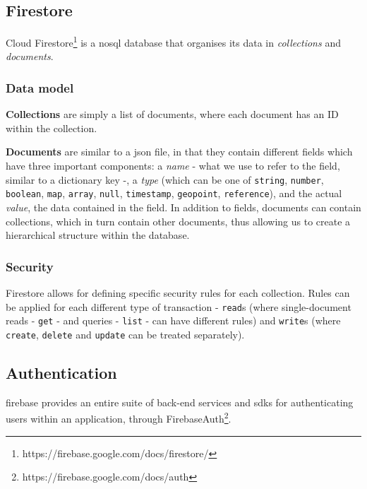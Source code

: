 \subsection{Firestore} \label{5:firestore}
Cloud Firestore\footnote{https://firebase.google.com/docs/firestore/} is a \gls{nosql} database that organises its data in \textit{collections} and \textit{documents}.

\subsubsection{Data model} \label{5:firestore_data_model}
\textbf{Collections} are simply a list of documents, where each document has an ID within the collection.

\textbf{Documents} are similar to a \gls{json} file, in that they contain different fields which have three important components: a \textit{name} - what we use to refer to the field, similar to a dictionary key -, a \textit{type} (which can be one of \texttt{string}, \texttt{number}, \texttt{boolean}, \texttt{map}, \texttt{array}, \texttt{null}, \texttt{timestamp}, \texttt{geopoint}, \texttt{reference}), and the actual \textit{value}, the data contained in the field.
In addition to fields, documents can contain collections, which in turn contain other documents, thus allowing us to create a hierarchical structure within the database.

\subsubsection{Security} \label{5:firestore_security}
Firestore allows for defining specific security rules for each collection. Rules can be applied for each different type of transaction - \texttt{read}s (where single-document reads - \texttt{get} - and queries - \texttt{list} - can have different rules) and \texttt{write}s (where \texttt{create}, \texttt{delete} and \texttt{update} can be treated separately).

\subsection{Authentication} \label{5:authentication}
\gls{firebase} provides an entire suite of back-end services and \acrshort{sdk}s for authenticating users within an application, through FirebaseAuth\footnote{https://firebase.google.com/docs/auth}.

